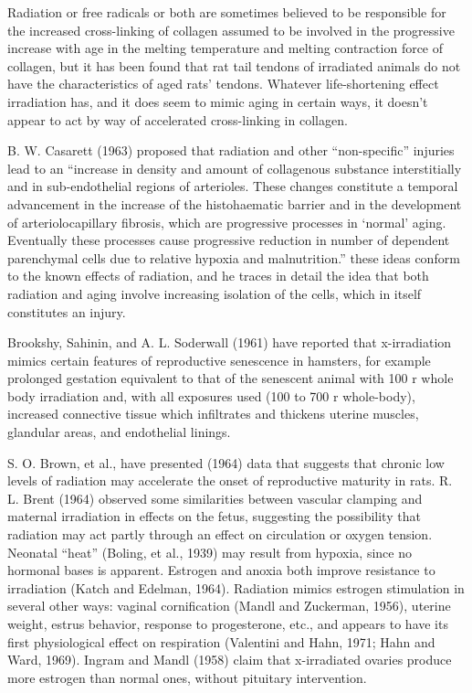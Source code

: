 Radiation or free radicals or both are sometimes believed to be responsible for the increased cross-linking of collagen assumed to be involved in the progressive increase with age
in the melting temperature and melting contraction force of collagen, but it has been found that rat tail tendons of irradiated animals do not have the characteristics of aged rats' tendons. Whatever
life-shortening effect irradiation has, and it does seem to mimic aging in certain ways, it doesn't appear to act by way of accelerated cross-linking in collagen.

B. W. Casarett (1963) proposed that radiation and other ``non-specific'' injuries lead to an ``increase in density and amount of collagenous substance interstitially and in sub-endothelial regions
of arterioles. These changes constitute a temporal advancement in the increase of the histohaematic barrier and in the development of arteriolocapillary fibrosis, which are progressive processes in `normal' aging. Eventually
these processes cause progressive reduction in number of dependent parenchymal cells due to relative hypoxia and malnutrition.'' these ideas conform to the known effects of radiation, and he traces
in detail the idea that both radiation and aging involve increasing isolation of the cells, which in itself constitutes an injury.

Brookshy, Sahinin, and A. L. Soderwall (1961) have reported that x-irradiation mimics certain features of reproductive senescence in hamsters, for example prolonged gestation equivalent to that of the senescent animal with 100 r whole body irradiation and, with all exposures used
(100 to 700 r whole-body), increased connective tissue which infiltrates and thickens uterine muscles, glandular areas, and endothelial linings.

S. O. Brown, et al., have presented (1964) data that suggests that chronic low levels of radiation may accelerate the onset of reproductive maturity in rats. R. L. Brent (1964) observed
some similarities between vascular clamping and maternal irradiation in effects on the fetus, suggesting the possibility that radiation may act partly through an effect on circulation or oxygen tension. Neonatal
``heat'' (Boling, et al., 1939) may result from hypoxia, since no hormonal bases is apparent. Estrogen and anoxia both improve resistance to irradiation (Katch and Edelman, 1964). Radiation
mimics estrogen stimulation in several other ways: vaginal cornification (Mandl and Zuckerman, 1956), uterine weight, estrus behavior, response to progesterone, etc., and appears to have its first
physiological effect on respiration (Valentini and Hahn, 1971; Hahn and Ward, 1969). Ingram and Mandl (1958) claim that x-irradiated ovaries produce more estrogen than normal ones, without pituitary intervention.

